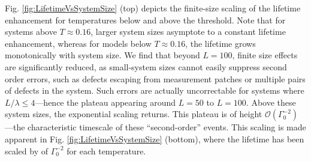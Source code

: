 \documentclass[twocolumn,superscriptaddress,aps,prb,floatfix]{revtex4-1}
\newcommand{\figref}[1]{Fig. \ref{#1}}
\begin{document}
\figref{fig:LifetimeVsSystemSize} (top) depicts the finite-size scaling of the lifetime enhancement for temperatures below and above the threshold.  Note that for systems above $T\approx0.16$, larger system sizes asymptote to a constant lifetime enhancement, whereas for models below $T\approx0.16$, the lifetime grows monotonically with system size.  We find that beyond $L=100$, finite size effects are significantly reduced, as small-system sizes cannot easily suppress second order errors, such as defects escaping from measurement patches or multiple pairs of defects in the system.  Such errors are actually uncorrectable for systems where $L/\lambda \leq 4$---hence the plateau appearing around $L=50$ to $L=100$.  Above these system sizes, the exponential scaling returns.  This plateau is of height $\mathcal{O}(\Gamma_0^{-2})$---the characteristic timescale of these ``second-order'' events.  This scaling is made apparent in \figref{fig:LifetimeVsSystemSize} (bottom), where the lifetime has been scaled by of $\Gamma_0^{-2}$ for each temperature.

\end{document}

